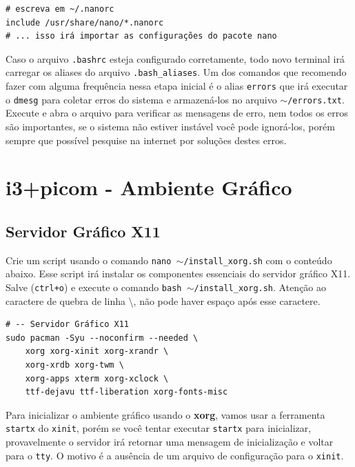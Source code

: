 \documentclass[12pt,a4paper]{article}
\begin{document}
\begin{lstlisting}
# escreva em ~/.nanorc
include /usr/share/nano/*.nanorc 
# ... isso irá importar as configurações do pacote nano 
\end{lstlisting}

\vspace{\baselineskip}

Caso o arquivo \texttt{.bashrc} esteja configurado corretamente, todo novo terminal irá carregar os aliases do arquivo \texttt{.bash\_aliases}. Um dos comandos que recomendo fazer com alguma frequência nessa etapa inicial é o alias \texttt{errors} que irá executar o \texttt{dmesg} para coletar erros do sistema e armazená-los no arquivo \texttt{$\sim$/errors.txt}. Execute e abra o arquivo para verificar as mensagens de erro, nem todos os erros são importantes, se o sistema não estiver instável você pode ignorá-los, porém sempre que possível pesquise na internet por soluções destes erros. 

\section{i3+picom - Ambiente Gráfico}

\subsection{Servidor Gráfico X11}

\hspace{\baselineskip}

Crie um script usando o comando \texttt{nano $\sim$/install\_xorg.sh} com o conteúdo abaixo. Esse script irá instalar os componentes essenciais do servidor gráfico X11. Salve (\texttt{ctrl+o}) e execute o comando \texttt{bash $\sim$/install\_xorg.sh}. Atenção ao caractere de quebra de linha \textbackslash, não pode haver espaço após esse caractere. \\

\begin{lstlisting}
# -- Servidor Gráfico X11
sudo pacman -Syu --noconfirm --needed \
    xorg xorg-xinit xorg-xrandr \
    xorg-xrdb xorg-twm \
    xorg-apps xterm xorg-xclock \
    ttf-dejavu ttf-liberation xorg-fonts-misc 
\end{lstlisting}

\vspace{\baselineskip}

Para inicializar o ambiente gráfico usando o \textbf{xorg}, vamos usar a ferramenta \texttt{startx} do \texttt{xinit}, porém se você tentar executar \texttt{startx} para inicializar, provavelmente o servidor irá retornar uma mensagem de inicialização e voltar para o \texttt{tty}. O motivo é a ausência de um arquivo de configuração para o \texttt{xinit}.
\end{document}
